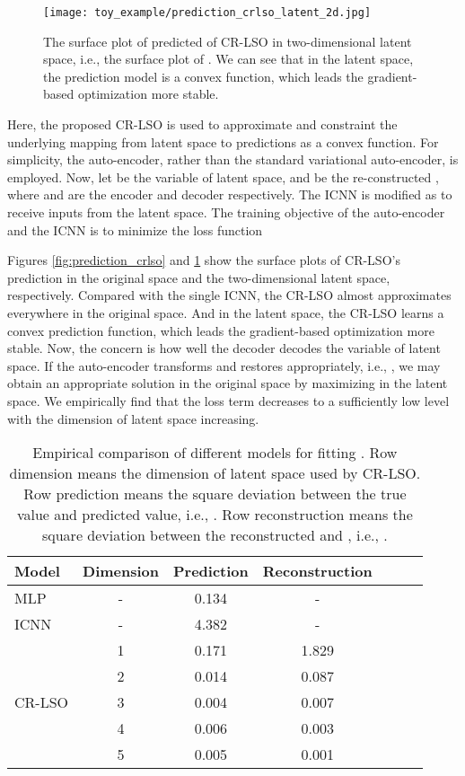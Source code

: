\documentclass[10pt,twocolumn,letterpaper]{article}
\begin{document}
\begin{figure}[htbp]
	\centering
	\texttt{[image: toy\_example/prediction\_crlso\_latent\_2d.jpg]}
	\caption{The surface plot of predicted  of CR-LSO in two-dimensional latent space, i.e., the surface plot of . We can see that in the latent space, the prediction model is a convex function, which leads the gradient-based optimization more stable.}
	\label{fig:prediction_crlso_latent}
\end{figure}

Here, the proposed CR-LSO is used to approximate  and constraint the underlying mapping from latent space to predictions as a convex function. For simplicity, the auto-encoder, rather than the standard variational auto-encoder, is employed. Now, let  be the variable of latent space, and  be the re-constructed , where  and  are the encoder and decoder respectively. The ICNN is modified as  to receive inputs from the latent space. The training objective of the auto-encoder and the ICNN is to minimize the loss function 

Figures \ref{fig:prediction_crlso} and \ref{fig:prediction_crlso_latent} show the surface plots of CR-LSO's prediction in the original space and the two-dimensional latent space, respectively. Compared with the single ICNN, the CR-LSO almost approximates  everywhere in the original space. And in the latent space, the CR-LSO learns a convex prediction function, which leads the gradient-based optimization more stable. Now, the concern is how well the decoder decodes the variable of latent space. If the auto-encoder transforms and restores  appropriately, i.e., , we may obtain an appropriate solution in the original space by maximizing  in the latent space. We empirically find that the loss term  decreases to a sufficiently low level with the dimension of latent space increasing. 
\begin{table}[htbp]
	\centering
	\caption{Empirical comparison of different models for fitting . Row dimension means the dimension of latent space used by CR-LSO. Row prediction means the square deviation between the true value and predicted value, i.e., . Row reconstruction means the square deviation between the reconstructed  and , i.e., .}
	\begin{tabular}{lcccccc}
		\toprule
		Model & Dimension & Prediction & Reconstruction \\
		\midrule
		MLP & - & 0.134 & -  \\
		ICNN & - & 4.382 & -  \\
		\midrule
		\multirow{6}{*}{CR-LSO} & 1 & 0.171 & 1.829 \\
		{} & 2 & 0.014 & 0.087  \\
		{} & 3 & 0.004 & 0.007  \\
		{} & 4 & 0.006 & 0.003 \\
		{} & 5 & 0.005 & 0.001  \\
		\bottomrule
	\end{tabular}
	\label{tab:empirical_comparison}
\end{table}
\end{document}
